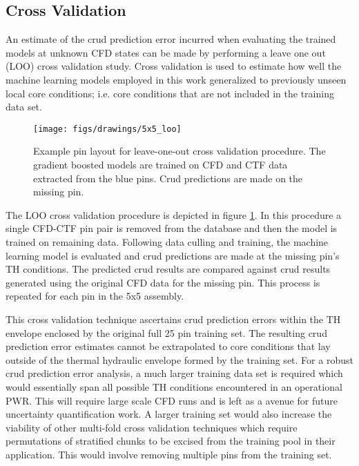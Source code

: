\subsection{Cross Validation}

An estimate of the crud prediction error incurred when evaluating the trained models at unknown CFD states can be made by performing a leave one out (LOO) cross validation study.  Cross validation is used to estimate how well the machine learning models employed in this work generalized to previously unseen local core conditions; i.e. core conditions that are not included in the training data set.

\begin{figure}[h]
    \centering
    \texttt{[image: figs/drawings/5x5\_loo]}
    \caption[Example pin layout for leave-one-out cross validation procedure.]{Example pin layout for leave-one-out cross validation procedure.  The gradient boosted models are trained on CFD and CTF data extracted from the blue pins.  Crud predictions are made on the missing pin.}
    \label{fig:5x5loo}
\end{figure}

The LOO cross validation procedure is depicted in figure \ref{fig:5x5loo}.  In this procedure a single CFD-CTF pin pair is removed from the database and then the model is trained on remaining data.  Following data culling and training, the machine learning model is evaluated and crud predictions are made at the missing pin's TH conditions.
The predicted crud results are compared against crud results generated using the original CFD data for the missing pin.  This process is repeated for each pin in the 5x5 assembly.

This cross validation technique ascertains crud prediction errors within the TH envelope enclosed by the original full 25 pin training set.  The resulting crud prediction error estimates cannot be extrapolated to core conditions that lay outside of the thermal hydraulic envelope formed by the training set.  For a robust crud prediction error analysis, a much larger training data set is required which would essentially span all possible TH conditions encountered in an operational PWR.  This will require large scale CFD runs and is left as a avenue for future uncertainty quantification work.  A larger training set would also increase the viability of other multi-fold cross validation techniques which require permutations of stratified chunks to be excised from the training pool in their application.  This would involve removing multiple pins from the training set.


